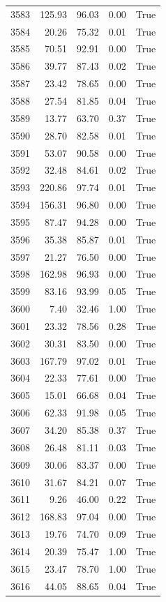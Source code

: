 \begin{longtable}{rrrrr}
3583 & 125.93 & 96.03 & 0.00 & True \\
3584 & 20.26 & 75.32 & 0.01 & True \\
3585 & 70.51 & 92.91 & 0.00 & True \\
3586 & 39.77 & 87.43 & 0.02 & True \\
3587 & 23.42 & 78.65 & 0.00 & True \\
3588 & 27.54 & 81.85 & 0.04 & True \\
3589 & 13.77 & 63.70 & 0.37 & True \\
3590 & 28.70 & 82.58 & 0.01 & True \\
3591 & 53.07 & 90.58 & 0.00 & True \\
3592 & 32.48 & 84.61 & 0.02 & True \\
3593 & 220.86 & 97.74 & 0.01 & True \\
3594 & 156.31 & 96.80 & 0.00 & True \\
3595 & 87.47 & 94.28 & 0.00 & True \\
3596 & 35.38 & 85.87 & 0.01 & True \\
3597 & 21.27 & 76.50 & 0.00 & True \\
3598 & 162.98 & 96.93 & 0.00 & True \\
3599 & 83.16 & 93.99 & 0.05 & True \\
3600 & 7.40 & 32.46 & 1.00 & True \\
3601 & 23.32 & 78.56 & 0.28 & True \\
3602 & 30.31 & 83.50 & 0.00 & True \\
3603 & 167.79 & 97.02 & 0.01 & True \\
3604 & 22.33 & 77.61 & 0.00 & True \\
3605 & 15.01 & 66.68 & 0.04 & True \\
3606 & 62.33 & 91.98 & 0.05 & True \\
3607 & 34.20 & 85.38 & 0.37 & True \\
3608 & 26.48 & 81.11 & 0.03 & True \\
3609 & 30.06 & 83.37 & 0.00 & True \\
3610 & 31.67 & 84.21 & 0.07 & True \\
3611 & 9.26 & 46.00 & 0.22 & True \\
3612 & 168.83 & 97.04 & 0.00 & True \\
3613 & 19.76 & 74.70 & 0.09 & True \\
3614 & 20.39 & 75.47 & 1.00 & True \\
3615 & 23.47 & 78.70 & 1.00 & True \\
3616 & 44.05 & 88.65 & 0.04 & True \\

\end{longtable}

